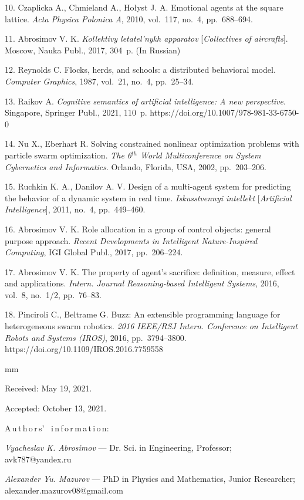 {10. Czaplicka A., Chmieland A., Ho{\l}yst J. A. Emotional agents at the square lattice. \textit{Acta Physica Polonica A}, 2010, vol.~117, no.~4, pp.~688--694.

11. Abrosimov V. K. \textit{Kollektivy letatel'nykh apparatov} [\textit{Collectives of aircrafts}]. Moscow, Nauka Publ., 2017, 304~p. (In Russian)

12. Reynolds C. Flocks, herds, and schools: a distributed behavioral model. \textit{Computer Graphics}, 1987, vol.~21, no.~4, pp.~25--34.

13. Raikov A. \textit{Cognitive semantics of artificial intelligence: A new perspective}. Singapore, Springer Publ., 2021, 110~p. https://doi.org/10.1007/978-981-33-6750-0

14. Nu X., Eberhart R. Solving constrained nonlinear optimization problems with particle swarm optimization. \textit{The 6$^{th}$ World Multiconference on System Cybernetics and Informatics}. Orlando, Florida, USA, 2002, pp.~203--206.

15. Ruchkin K. A., Danilov A. V. Design of a multi-agent system for predicting the behavior of a dynamic system in real time. \textit{Iskusstvennyi intellekt} [\textit{Artificial Intelligence}], 2011, no.~4, pp.~449--460.

16. Abrosimov V. K. Role allocation in a group of control objects: general purpose approach. \textit{Recent Developments in Intelligent Nature-Inspired Computing}, IGI Global Publ., 2017, pp.~206--224.

17. Abrosimov V. K. The property of agent's sacrifice: definition, measure, effect and applications. \textit{Intern. Journal Reasoning-based Intelligent Systems}, 2016, vol.~8, no.~1/2, pp.~76--83.

18. Pinciroli C., Beltrame G. Buzz: An extensible programming language for heterogeneous swarm robotics. \textit{2016 IEEE/RSJ Intern. Conference on Intelligent Robots and Systems (IROS)}, 2016, pp.~3794--3800. https://doi.org/10.1109/IROS.2016.7759558

mm

%


Received:  May 19, 2021.

Accepted: October 13, 2021.

\vskip 6mm


A\,u\,t\,h\,o\,r\,s' \ i\,n\,f\,o\,r\,m\,a\,t\,i\,o\,n:


\vskip 2mm \textit{Vyacheslav K. Abrosimov} --- Dr. Sci. in Engineering, Professor; avk787@yandex.ru \par

\vskip 2mm \textit{Alexander Yu. Mazurov} --- PhD in Physics and Mathematics, Junior Researcher;\\ alexander.mazurov08@gmail.com \par
%
}
